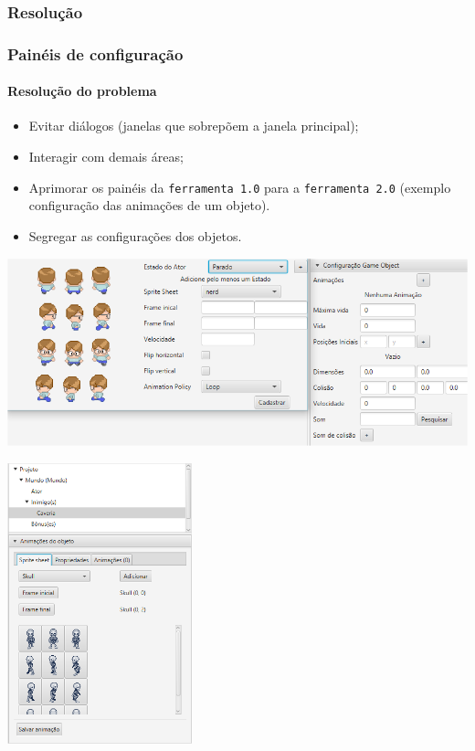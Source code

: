 \documentclass[]{beamer}
\begin{document}
   \subsubsection{Resolução}
   \begin{frame}
      \frametitle{Painéis de configuração}
      \framesubtitle{Resolução do problema}

      \begin{itemize}
         \item Evitar diálogos (janelas que sobrepõem a janela principal);
         \item Interagir com demais áreas;
         \item Aprimorar os painéis da \texttt{ferramenta 1.0} para a \texttt{ferramenta 2.0} (exemplo configuração das animações de um objeto).
         \item Segregar as configurações dos objetos.
      \end{itemize}
   \end{frame}

   \begin{frame}
      \begin{center}
         \includegraphics[width=\textwidth]{images/add_animacao_1.png}
      \end{center}
   \end{frame}

   \begin{frame}
      \begin{center}
         \includegraphics[width=0.4\textwidth]{images/add_animacao_2.png}
      \end{center}
   \end{frame}
\end{document}
